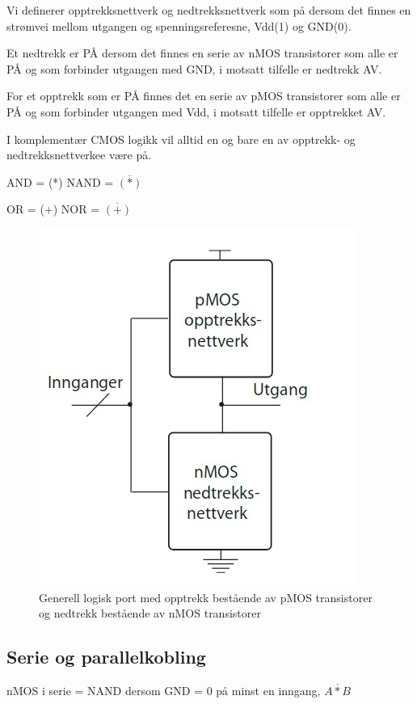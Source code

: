 \documentclass{article}
\begin{document}
	Vi definerer opptrekksnettverk og nedtrekksnettverk som på dersom det finnes en strømvei mellom utgangen og spenningsreferesne, Vdd(1) og GND(0).
	
	Et nedtrekk er PÅ dersom det finnes en serie av nMOS transistorer som alle er PÅ og som forbinder utgangen med GND, i motsatt tilfelle er nedtrekk AV.
	
	For et opptrekk som er PÅ finnes det en serie av pMOS transistorer som alle er PÅ og som forbinder utgangen med Vdd, i motsatt tilfelle er opptrekket AV.
	
	I komplementær CMOS logikk vil alltid en og bare en av opptrekk- og nedtrekksnettverkee være på.
	
	AND = (*)
	NAND = $\overline{(*)}$
	
	OR = (+)
	NOR = $\overline{(+)}$
	
	\begin{figure}[H]
		\includegraphics[scale = 0.6]{OPPned.jpg}
		\caption{Generell logisk port med opptrekk bestående av pMOS transistorer og nedtrekk bestående av nMOS transistorer}
	\end{figure}
	
	\subsection{Serie og parallelkobling}
	nMOS i serie = NAND dersom GND = 0 på minst en inngang, $\overline{A*B}$
	
\end{document}
